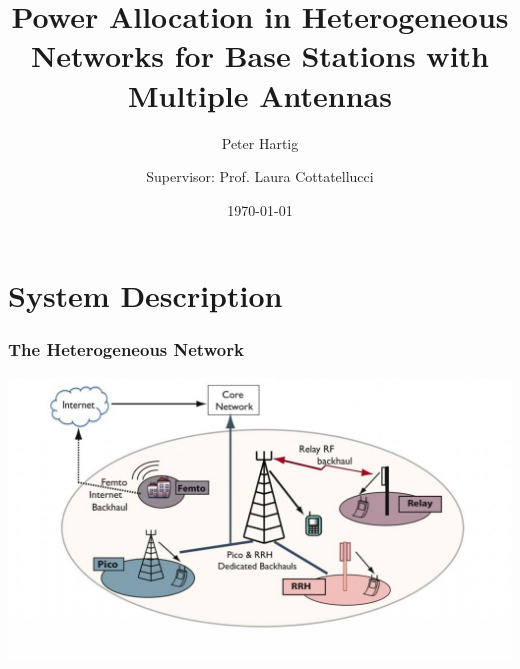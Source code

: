 \documentclass[10pt,tgadventor, onlymath]{beamer}
\title{\large \bfseries Power Allocation in Heterogeneous Networks for Base Stations with Multiple Antennas}
\author{Peter Hartig \\ \and Supervisor: Prof. Laura  Cottatellucci
}
\date{\today}
\begin{document}
\frame{
\thispagestyle{empty}
\titlepage
}

\section{System Description}
\begin{frame}
\frametitle{The Heterogeneous Network}
	\includegraphics[width=\textwidth]{het_net}
\end{frame}
\end{document}

